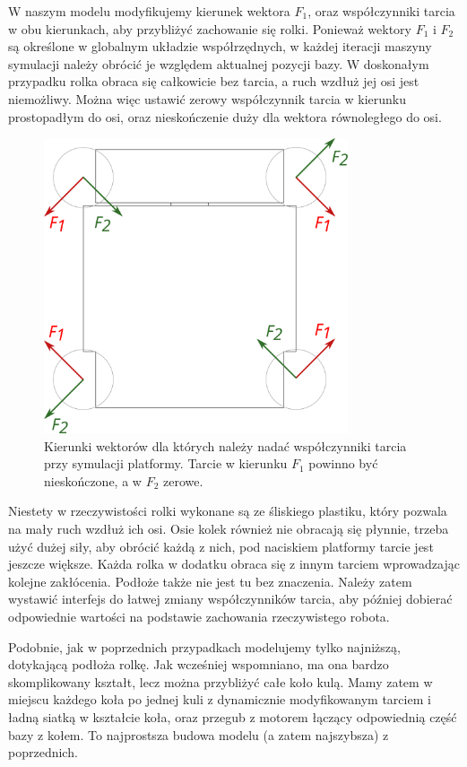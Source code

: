 		W naszym modelu modyfikujemy kierunek wektora $F_1$, oraz współczynniki tarcia w obu kierunkach, aby przybliżyć zachowanie się rolki.
		Ponieważ wektory $F_1$ i $F_2$ są określone w globalnym układzie współrzędnych, w każdej iteracji maszyny symulacji należy obrócić je względem aktualnej pozycji bazy.
		W doskonałym przypadku rolka obraca się całkowicie bez tarcia, a ruch wzdłuż jej osi jest niemożliwy.
		Można więc ustawić zerowy współczynnik tarcia w kierunku prostopadłym do osi, oraz nieskończenie duży dla wektora równoległego do osi.

		\begin{figure}[H]
		\centering
		\includegraphics[width=0.8\textwidth]{graphics/base_vects.pdf}
		\caption{Kierunki wektorów dla których należy nadać współczynniki tarcia przy symulacji platformy. Tarcie w kierunku $F_1$ powinno być nieskończone, a w $F_2$ zerowe.}
		\end{figure} 

		Niestety w rzeczywistości rolki wykonane są ze śliskiego plastiku, który pozwala na mały ruch wzdłuż ich osi.
		Osie kolek również nie obracają się płynnie, trzeba użyć dużej siły, aby obrócić każdą z nich, pod naciskiem platformy tarcie jest jeszcze większe.
		Każda rolka w dodatku obraca się z innym tarciem wprowadzając kolejne zakłócenia.
		Podłoże także nie jest tu bez znaczenia.
		Należy zatem wystawić interfejs do łatwej zmiany współczynników tarcia, aby później dobierać odpowiednie wartości na podstawie zachowania rzeczywistego robota.

		Podobnie, jak w poprzednich przypadkach modelujemy tylko najniższą, dotykającą podłoża rolkę.
		Jak wcześniej wspomniano, ma ona bardzo skomplikowany kształt, lecz można przybliżyć całe koło kulą.
		Mamy zatem w miejscu każdego koła po jednej kuli z dynamicznie modyfikowanym tarciem i ładną siatką w kształcie koła, oraz przegub z motorem łączący odpowiednią część bazy z kołem.
		To najprostsza budowa modelu (a zatem najszybsza) z poprzednich.

